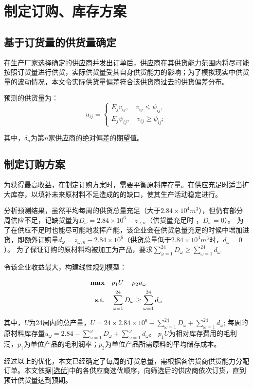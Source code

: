 
\section{制定订购、库存方案}
\subsection{基于订货量的供货量确定}

在生产厂家选择确定的供应商并发出订单后，供应商在其供货能力范围内将尽可能按照订货量进行供货，实际供货量受其自身供货能力的影响；为了模拟现实中供货量的波动情况，本文令实际供货量偏差符合该供货商过去的供货偏差分布。

预测的供货量为：
\begin{equation}
    u_{i j}=\left\{\begin{array}{l}
E_{j} v_{i j}, \quad v_{i j} \leq \psi_{i j}, \\
E_{j} \psi_{i j}, \quad v_{i j} \geq {\psi}_{i j};
\end{array}\right.
\end{equation}

\noindent 其中，$\delta_n$为第$n$家供应商的绝对偏差的期望值。


\subsection{制定订购方案}

为获得最高收益，在制定订购方案时，需要平衡原料库存量。在供应充足时适当扩大库存，以填补未来原材料不足造成的的缺口，使其生产活动稳定进行。

分析预测结果，虽然平均每周的供货总量充足（大于$2.84 \times 10^4 m^3$），但仍有部分周供应不足，记缺货量为$D_{\omega}=2.84 \times10^6-z_{\omega,n}$（供货量充足时 ，$D_{\omega}=0$）。
为了在供应不足时也能尽可能地发挥产能，该企业会在供货总量充足的时候中增加进货，即额外订购量$d_{\omega}=z_{\omega,n}-2.84 \times 10^6$（供货总量低于$2.84 \times 10^4 m^3$时，$d_{\omega}=0$）。
为了保证订购的原材料均被加工为产品，要求$\sum_{\omega=1}^{24}D_{\omega} \geq \sum_{\omega=1}^{24}d_{\omega}$

令该企业收益最大，构建线性规划模型：

\begin{equation}
\begin{split}
{\bf max}\quad &p_1U-p_2u_{\omega} \\
{\bf s.t.}\quad &\sum_{\omega=1}^{24}D_{\omega} \geq \sum_{\omega=1}^{24}d_{\omega}
\end{split}
\end{equation}

\noindent 其中，$U$为24周内的总产量，$U=24 \times 2.84\times10^6-\sum_{\omega=1}^{24}D_{\omega}+\sum_{\omega=1}^{24}d_{\omega}$;
每周的原材料库存量$u_{\omega}=2.84-\sum_{\omega=1}^{\omega}D_{\omega}+\sum_{\omega=1}^{\omega}d_{\omega}$。
$p_1U$为相对库存费用的毛利润，$p_1$为单位产品的毛利润率；$p_2$为单位产品所需原料的平均储存成本。

经过以上的优化，本文已经确定了每周的订货总量，需根据各供货商供货能力分配订单。本文依据\ref{选优}中的各供应商选优顺序，向筛选后的供应商依次订货，直到预计供货量达到预期。